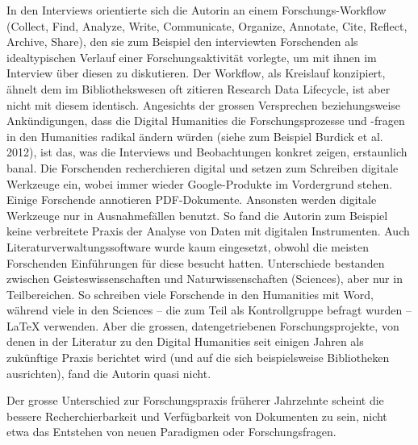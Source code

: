 \documentclass[a4paper,
fontsize=11pt,
oneside,
numbers=noperiodatend,
parskip=half-,
bibliography=totoc,
final
]{scrartcl}
\begin{document}
In den Interviews orientierte sich die Autorin an einem
Forschungs-Workflow (Collect, Find, Analyze, Write, Communicate,
Organize, Annotate, Cite, Reflect, Archive, Share), den sie zum Beispiel
den interviewten Forschenden als idealtypischen Verlauf einer
Forschungsaktivität vorlegte, um mit ihnen im Interview über diesen zu
diskutieren. Der Workflow, als Kreislauf konzipiert, ähnelt dem im
Bibliothekswesen oft zitieren Research Data Lifecycle, ist aber nicht
mit diesem identisch. Angesichts der grossen Versprechen beziehungsweise
Ankündigungen, dass die Digital Humanities die Forschungsprozesse und
-fragen in den Humanities radikal ändern würden (siehe zum Beispiel
Burdick et al. 2012), ist das, was die Interviews und Beobachtungen
konkret zeigen, erstaunlich banal. Die Forschenden recherchieren digital
und setzen zum Schreiben digitale Werkzeuge ein, wobei immer wieder
Google-Produkte im Vordergrund stehen. Einige Forschende annotieren
PDF-Dokumente. Ansonsten werden digitale Werkzeuge nur in Ausnahmefällen
benutzt. So fand die Autorin zum Beispiel keine verbreitete Praxis der
Analyse von Daten mit digitalen Instrumenten. Auch
Literaturverwaltungssoftware wurde kaum eingesetzt, obwohl die meisten
Forschenden Einführungen für diese besucht hatten. Unterschiede
bestanden zwischen Geisteswissenschaften und Naturwissenschaften
(Sciences), aber nur in Teilbereichen. So schreiben viele Forschende in
den Humanities mit Word, während viele in den Sciences -- die zum Teil
als Kontrollgruppe befragt wurden -- LaTeX verwenden. Aber die grossen,
datengetriebenen Forschungsprojekte, von denen in der Literatur zu den
Digital Humanities seit einigen Jahren als zukünftige Praxis berichtet
wird (und auf die sich beispielsweise Bibliotheken ausrichten), fand die
Autorin quasi nicht.

Der grosse Unterschied zur Forschungspraxis früherer Jahrzehnte scheint
die bessere Recherchierbarkeit und Verfügbarkeit von Dokumenten zu sein,
nicht etwa das Entstehen von neuen Paradigmen oder Forschungsfragen.
\end{document}
